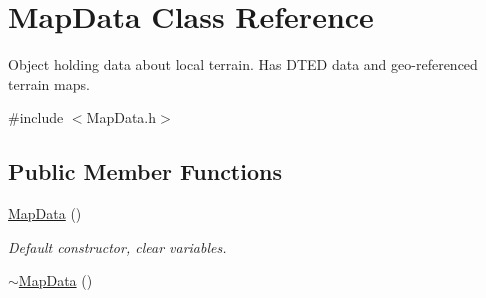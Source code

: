 \hypertarget{class_map_data}{
\section{MapData Class Reference}
\label{class_map_data}
}


Object holding data about local terrain. Has DTED data and geo-\/referenced terrain maps.  




{\ttfamily \#include $<$MapData.h$>$}

\subsection*{Public Member Functions}
\begin{DoxyCompactItemize}
\item 
\hypertarget{class_map_data_aca1581fc02ec46b4da7ed9b83c04a116}{
\hyperlink{class_map_data_aca1581fc02ec46b4da7ed9b83c04a116}{MapData} ()}
\label{class_map_data_aca1581fc02ec46b4da7ed9b83c04a116}

\begin{DoxyCompactList}\small\item\em Default constructor, clear variables. \end{DoxyCompactList}\item 
\hypertarget{class_map_data_afc3e096cf252c30641055ea4eaaab410}{
\hyperlink{class_map_data_afc3e096cf252c30641055ea4eaaab410}{$\sim$MapData} ()}
\label{class_map_data_afc3e096cf252c30641055ea4eaaab410}


\end{DoxyCompactItemize}
